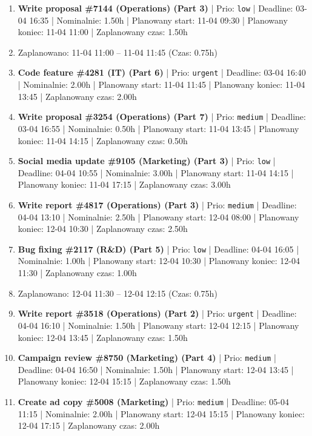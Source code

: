 {\begin{enumerate}
  \item [\textbf{14702}] \textbf{Write proposal \#7144 (Operations) (Part 3)} | Prio: \texttt{low} | Deadline: 03-04 16:35 | Nominalnie: 1.50h | Planowany start: 11-04 09:30 | Planowany koniec: 11-04 11:00 | Zaplanowany czas: 1.50h
  \item [\textbf{PRZERWA}] Zaplanowano: 11-04 11:00 -- 11-04 11:45 (Czas: 0.75h)
  \item [\textbf{14604}] \textbf{Code feature \#4281 (IT) (Part 6)} | Prio: \texttt{urgent} | Deadline: 03-04 16:40 | Nominalnie: 2.00h | Planowany start: 11-04 11:45 | Planowany koniec: 11-04 13:45 | Zaplanowany czas: 2.00h
  \item [\textbf{14663}] \textbf{Write proposal \#3254 (Operations) (Part 7)} | Prio: \texttt{medium} | Deadline: 03-04 16:55 | Nominalnie: 0.50h | Planowany start: 11-04 13:45 | Planowany koniec: 11-04 14:15 | Zaplanowany czas: 0.50h
  \item [\textbf{14698}] \textbf{Social media update \#9105 (Marketing) (Part 3)} | Prio: \texttt{low} | Deadline: 04-04 10:55 | Nominalnie: 3.00h | Planowany start: 11-04 14:15 | Planowany koniec: 11-04 17:15 | Zaplanowany czas: 3.00h
  \item [\textbf{14639}] \textbf{Write report \#4817 (Operations) (Part 3)} | Prio: \texttt{medium} | Deadline: 04-04 13:10 | Nominalnie: 2.50h | Planowany start: 12-04 08:00 | Planowany koniec: 12-04 10:30 | Zaplanowany czas: 2.50h
  \item [\textbf{14689}] \textbf{Bug fixing \#2117 (R\&D) (Part 5)} | Prio: \texttt{low} | Deadline: 04-04 16:05 | Nominalnie: 1.00h | Planowany start: 12-04 10:30 | Planowany koniec: 12-04 11:30 | Zaplanowany czas: 1.00h
  \item [\textbf{PRZERWA}] Zaplanowano: 12-04 11:30 -- 12-04 12:15 (Czas: 0.75h)
  \item [\textbf{14598}] \textbf{Write report \#3518 (Operations) (Part 2)} | Prio: \texttt{urgent} | Deadline: 04-04 16:10 | Nominalnie: 1.50h | Planowany start: 12-04 12:15 | Planowany koniec: 12-04 13:45 | Zaplanowany czas: 1.50h
  \item [\textbf{14632}] \textbf{Campaign review \#8750 (Marketing) (Part 4)} | Prio: \texttt{medium} | Deadline: 04-04 16:50 | Nominalnie: 1.50h | Planowany start: 12-04 13:45 | Planowany koniec: 12-04 15:15 | Zaplanowany czas: 1.50h
  \item [\textbf{14666}] \textbf{Create ad copy \#5008 (Marketing)} | Prio: \texttt{medium} | Deadline: 05-04 11:15 | Nominalnie: 2.00h | Planowany start: 12-04 15:15 | Planowany koniec: 12-04 17:15 | Zaplanowany czas: 2.00h

\end{enumerate}}
